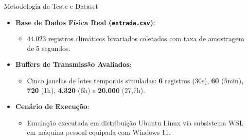 \documentclass[aspectratio=169]{beamer}
\begin{document}
\begin{frame}{Metodologia de Teste e Dataset}
  \begin{itemize}
    \item \textbf{Base de Dados Física Real (\texttt{entrada.csv})}:
      \begin{itemize}
        \item $44.023$ registros climáticos bivariados coletados com taxa de amostragem de 5 segundos.
      \end{itemize}
    \vspace{0.3cm}
    \item \textbf{Buffers de Transmissão Avaliados}:
      \begin{itemize}
        \item Cinco janelas de lotes temporais simuladas: \textbf{6} registros (30s), \textbf{60} (5min), \textbf{720} (1h), \textbf{4.320} (6h) e \textbf{20.000} (27,7h).
      \end{itemize}
    \vspace{0.3cm}
    \item \textbf{Cenário de Execução}:
      \begin{itemize}
        \item Emulação executada em distribuição Ubuntu Linux via subsistema WSL em máquina pessoal equipada com Windows 11.
      \end{itemize}
  \end{itemize}
\end{frame}
\end{document}
